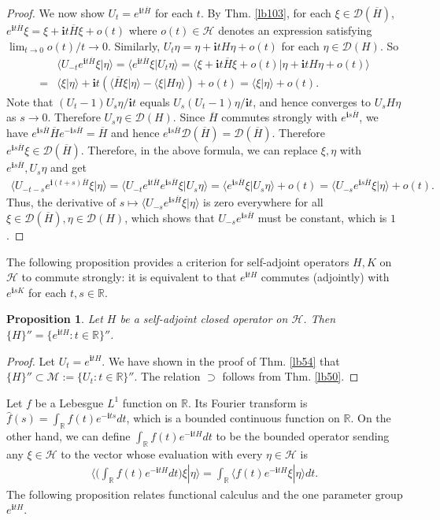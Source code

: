 \documentclass[12pt,b5paper,notitlepage]{article}
\theoremstyle{definition}
\theoremstyle{plain}
\newtheorem{pp}[df]{Proposition}
\newcommand{\mc}{\mathcal}
\newcommand{\wht}{\widehat}
\newcommand{\ovl}{\overline}
\newcommand{\Dom}{\scr D}
\newcommand{\bk}[1]{\langle {#1}\rangle}
\newcommand{\scr}{\mathscr}
\newcommand{\im}{\mathbf{i}}
\newcommand{\Rbb}{\mathbb R}
\numberwithin{equation}{section}
\begin{document}
\begin{proof}
We now show $U_t=e^{\im t\ovl H}$ for each $t$. By Thm. \ref{lb103}, for each $\xi\in\Dom(\ovl H)$, $e^{\im t\ovl H}\xi=\xi+\im t\ovl H\xi+o(t)$ where $o(t)\in\mc H$ denotes an expression satisfying $\lim_{t\rightarrow 0}o(t)/t\rightarrow 0$. Similarly, $U_t\eta=\eta+\im tH\eta+o(t)$ for each $\eta\in\Dom(H)$. So
\begin{align*}
&\bk{U_{-t}e^{\im t\ovl H}\xi|\eta}=\bk{e^{\im t\ovl H}\xi|U_t\eta}=\bk{\xi+\im t\ovl H\xi+o(t)|\eta+\im tH\eta+o(t)}\\
=&\bk{\xi|\eta}+\im t(\bk{\ovl H\xi|\eta}-\bk{\xi|H\eta})+o(t)=\bk{\xi|\eta}+o(t).	
\end{align*}
Note that $(U_t-1)U_s\eta/\im t$ equals $U_s(U_t-1)\eta/{\im t}$, and hence converges to $U_s H\eta$ as $s\rightarrow0$. Therefore $U_s\eta\in\Dom(H)$. Since $\ovl H$ commutes strongly with $e^{\im s\ovl H}$, we have $e^{\im s\ovl H}\ovl He^{-\im s\ovl H}=\ovl H$ and hence $e^{\im s\ovl H}\Dom(\ovl H)=\Dom(\ovl H)$. Therefore $e^{\im s\ovl H}\xi\in\Dom(\ovl H)$. Therefore, in the above formula, we can replace $\xi,\eta$ with $e^{\im s\ovl H},U_s\eta$ and get
\begin{align*}
\bk{U_{-t-s}e^{\im (t+s)\ovl H}\xi|\eta}=\bk{U_{-t}e^{\im t\ovl H}e^{\im s\ovl H}\xi|U_s\eta}=\bk{e^{\im s\ovl H}\xi|U_s\eta}+o(t)=\bk{U_{-s}e^{\im s\ovl H}\xi|\eta}+o(t).
\end{align*}
Thus, the derivative of $s\mapsto \bk{U_{-s}e^{\im s\ovl H}\xi|\eta}$ is zero everywhere for all $\xi\in\Dom(\ovl H),\eta\in\Dom(H)$, which shows that $U_{-s}e^{\im s\ovl H}$ must be constant, which is $1$.
\end{proof}


The following proposition provides a criterion for self-adjoint operators $H,K$ on $\mc H$ to commute strongly: it is equivalent to that $e^{\im tH}$ commutes (adjointly) with $e^{\im sK}$ for each $t,s\in\Rbb$.


\begin{pp}
Let $H$ be a self-adjoint closed operator on $\mc H$. Then $\{H\}''=\{e^{\im tH}:t\in\Rbb\}''$.
\end{pp}

\begin{proof}
Let $U_t=e^{\im tH}$. We have shown in the proof of Thm. \ref{lb54} that $\{H\}''\subset \mc M:=\{U_t:t\in\Rbb\}''$. The relation $\supset$ follows from Thm. \ref{lb50}.
\end{proof}



Let $f$ be a Lebesgue $L^1$ function on $\Rbb$. Its Fourier transform is $\wht f(s)=\int_\Rbb f(t)e^{-\im ts}dt$, which is a bounded continuous function on $\Rbb$. On the other hand, we can define $\int_\Rbb f(t)e^{-\im tH}dt$ to be the bounded operator sending any $\xi\in\mc H$ to the vector whose evaluation with every $\eta\in\mc H$ is
\begin{align*}
\Big\langle \big(\int_\Rbb f(t)e^{-\im tH}dt\big)\xi|\eta  \Big\rangle	=\int_\Rbb\big\langle f(t)e^{-\im tH}\xi|\eta\big\rangle dt.
\end{align*} 
The following proposition relates functional calculus and the one parameter group $e^{\im tH}$.
\end{document}
